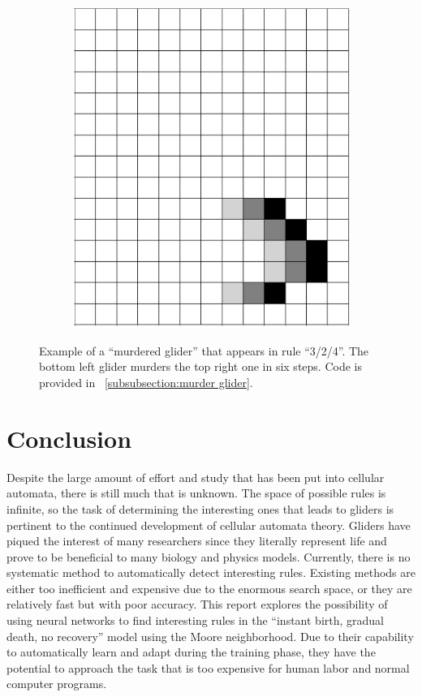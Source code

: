 \documentclass[12pt]{article}
\numberwithin{figure}{section} %
\begin{document}
\begin{figure}[H]
\begin{subfigure}{0.22\textwidth}
     		\subcaption{}
   	\end{subfigure}
	\begin{subfigure}{0.22\textwidth}
     		\includegraphics[width=\linewidth]{Section4/36.6}
     		\subcaption{}
   	\end{subfigure}
   \caption[Example of a "murdered glider"]{Example of a “murdered glider” that appears in rule “3/2/4”. The bottom left glider murders the top right one in six steps. Code is provided in ~\ref{subsubsection:murder glider}.}
   \label{fig:murder glider}
\end{figure}

\newpage
\section{Conclusion}
Despite the large amount of effort and study that has been put into cellular automata, there is still much that is unknown. The space of possible rules is infinite, so the task of determining the interesting ones that leads to gliders is pertinent to the continued development of cellular automata theory. Gliders have piqued the interest of many researchers since they literally represent life and prove to be beneficial to many biology and physics models. Currently, there is no systematic method to automatically detect interesting rules. Existing methods are either too inefficient and expensive due to the enormous search space, or they are relatively fast but with poor accuracy. This report explores the possibility of using neural networks to find interesting rules in the “instant birth, gradual death, no recovery” model using the Moore neighborhood. Due to their capability to automatically learn and adapt during the training phase, they have the potential to approach the task that is too expensive for human labor and normal computer programs. 
\end{document}
